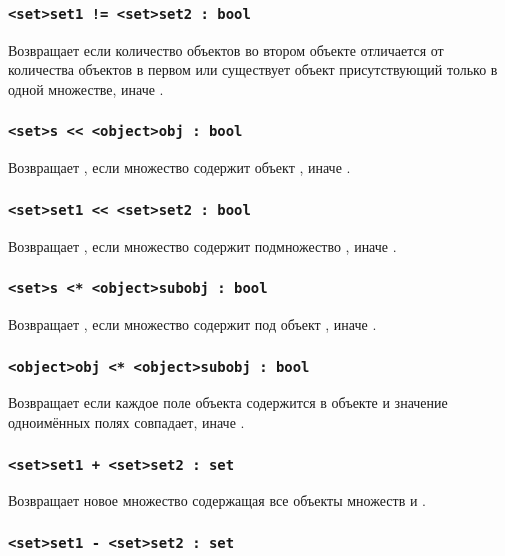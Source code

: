 \documentclass[a4paper, 14pt]{extarticle}
\begin{document}
\subsubsection{\lstinline`<set>set1 != <set>set2 : bool`}

Возвращает \true{} если количество объектов во втором объекте отличается от количества объектов в первом или существует объект присутствующий только в одной множестве, иначе \false{}.

\subsubsection{\lstinline`<set>s << <object>obj : bool`}

Возвращает \true{}, если множество  содержит объект , иначе \false{}.

\subsubsection{\lstinline|<set>set1 << <set>set2 : bool|}

Возвращает \true, если множество  содержит подмножество , иначе \false.

\subsubsection{\lstinline`<set>s <* <object>subobj : bool`}

Возвращает \true{}, если множество  содержит под объект , иначе \false{}.

\subsubsection{\lstinline`<object>obj <* <object>subobj : bool`}

Возвращает \true{} если каждое поле объекта  содержится в объекте  и значение одноимённых полях совпадает, иначе \false{}.

\subsubsection{\lstinline`<set>set1 + <set>set2 : set`}

Возвращает новое множество содержащая все объекты множеств  и .

\subsubsection{\lstinline`<set>set1 - <set>set2 : set`}
\end{document}
